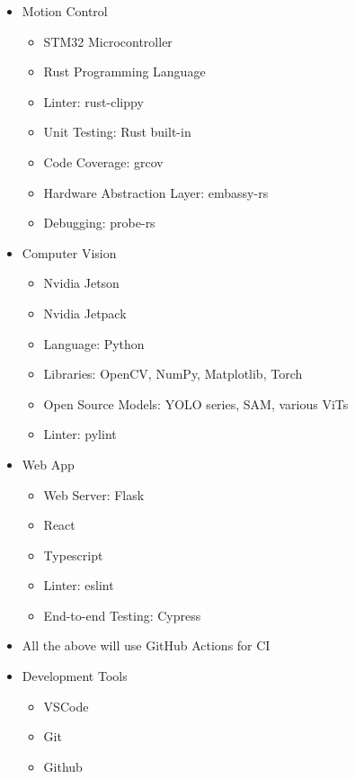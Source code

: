 \documentclass{article}
\begin{document}
\begin{itemize}
  \item Motion Control
        \begin{itemize}
          \item STM32 Microcontroller
          \item Rust Programming Language
          \item Linter: rust-clippy
          \item Unit Testing: Rust built-in
          \item Code Coverage: grcov
          \item Hardware Abstraction Layer: embassy-rs
          \item Debugging: probe-rs
        \end{itemize}
  \item Computer Vision
        \begin{itemize}
          \item Nvidia Jetson
          \item Nvidia Jetpack
          \item Language: Python
          \item Libraries: OpenCV, NumPy, Matplotlib, Torch
          \item Open Source Models: YOLO series, SAM, various ViTs
          \item Linter: pylint
        \end{itemize}
  \item Web App
        \begin{itemize}
          \item Web Server: Flask
          \item React
          \item Typescript
          \item Linter: eslint
          \item End-to-end Testing: Cypress
        \end{itemize}
  \item All the above will use GitHub Actions for CI
  \item Development Tools
        \begin{itemize}
          \item VSCode
          \item Git
          \item Github
        \end{itemize}
\end{itemize}
\end{document}
